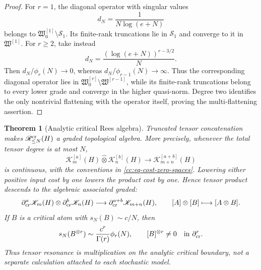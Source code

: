 \documentclass[10pt,reqno]{amsart}
\theoremstyle{plain}
\newtheorem{theorem}{Theorem}[section]
\theoremstyle{definition}
\theoremstyle{remark}
\begin{document}
\begin{proof}
For \(r=1\), the diagonal operator with singular values
\[
 d_N=\frac1{N\log(e+N)}
\]
belongs to \(\mathfrak W^{[1]}_0\setminus\mathcal S_1\).  Its finite-rank
truncations lie in \(\mathcal S_1\) and converge to it in
\(\mathfrak W^{[1]}\).  For \(r\ge2\), take instead
\[
 d_N=\frac{(\log(e+N))^{r-3/2}}N.
\]
Then \(d_N/\phi_r(N)\to0\), whereas
\(d_N/\phi_{r-1}(N)\to\infty\).  Thus the corresponding diagonal operator
lies in \(\mathfrak W^{[r]}_0\setminus\mathfrak W^{[r-1]}\), while its
finite-rank truncations belong to every lower grade and converge in the
higher quasi-norm.  Degree two identifies the only nontrivial flattening
with the operator itself, proving the multi-flattening assertion.
\end{proof}

\begin{theorem}[Analytic critical Rees algebra]
\label{cc:thm-analytic-critical-rees-algebra}
Truncated tensor concatenation makes
\(\mathscr R^{\rm cr}_{\le N}(H)\) a graded topological algebra.  More
precisely, whenever the total tensor degree is at most \(N\),
\begin{equation}
 \mathscr K_m^{[a]}(H)\widehat\otimes
 \mathscr K_n^{[b]}(H)
 \longrightarrow
 \mathscr K_{m+n}^{[a+b]}(H)
 \label{cc:eq-critical-cost-addition}
\end{equation}
is continuous, with the conventions in
\eqref{cc:eq-cost-zero-spaces}.  Lowering either positive input cost by one
lowers the product cost by one.  Hence tensor product descends to the algebraic associated graded:
\begin{equation}
 \partial_{\rm cr}^a\mathscr K_m(H)\otimes
 \partial_{\rm cr}^b\mathscr K_n(H)
 \longrightarrow
 \partial_{\rm cr}^{a+b}\mathscr K_{m+n}(H),
 \qquad [A]\otimes[B]\longmapsto[A\otimes B].
 \label{cc:eq-critical-graded-product}
\end{equation}
If \(B\) is a critical atom with \(s_N(B)\sim c/N\), then
\begin{equation}
 s_N(B^{\otimes r})
 \sim\frac{c^r}{\Gamma(r)}\phi_r(N),
 \qquad
 [B]^{\otimes r}\ne0
 \quad\text{in }\partial_{\rm cr}^r.
 \label{cc:eq-exact-atom-Rees-power}
\end{equation}
Thus tensor resonance is multiplication on the analytic critical boundary,
not a separate calculation attached to each stochastic model.
\end{theorem}
\end{document}

